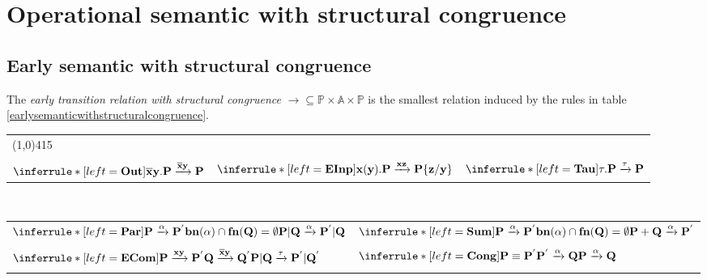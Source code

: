 \section{Operational semantic with structural congruence}

\subsection{Early semantic with structural congruence}

\begin{definition}
  The \emph{early transition relation with structural congruence} $\rightarrow\subseteq \mathbb{P}\times \mathbb{A} \times \mathbb{P}$ is the smallest relation induced by the rules in table \ref{earlysemanticwithstructuralcongruence}.

  \begin{table}
    \begin{tabular}{lll}  
      	\multicolumn{3}{l}{\line(1,0){415}}\\\\
	  $\inferrule* [left=\bf{Out}]{
	  }{
	    \overline{x}y.P \xrightarrow{\overline{x}y} P
	  }$
	&
	  $\inferrule* [left=\bf{EInp}]{
	  }{
	    x(y).P \xrightarrow{xz} P\{z/y\}
	  }$
	&
	  $\inferrule* [left=\bf{Tau}]{
	  }{
	    \tau.P \xrightarrow{\tau} P
	  }$
      \\
    \end{tabular}
    \\
    \begin{tabular}{ll}  
      \\
	  $\inferrule* [left=\bf{Par}]{
	      P \xrightarrow{\alpha} P^{'}
	    \\
	      bn(\alpha)\cap fn(Q)=\emptyset
	  }{
	    P|Q \xrightarrow{\alpha} P^{'}|Q
	  }$
	  &
	  $\inferrule* [left=\bf{Sum}]{
	      P \xrightarrow{\alpha} P^{'}
	    \\
	      bn(\alpha)\cap fn(Q)=\emptyset
	  }{
	    P+Q \xrightarrow{\alpha} P^{'}
	  }$
      \\\\
	  $\inferrule* [left=\bf{ECom}]{
	      P \xrightarrow{xy} P^{'}
	    \\
	      Q\xrightarrow{\overline{x}y} Q^{'}
	  }{
	    P|Q \xrightarrow{\tau} P^{'}|Q^{'}
	  }$
	  &
	  $\inferrule* [left=\bf{Cong}]{
	      P\equiv P^{'}
	    \\
	      P^{'}\xrightarrow{\alpha} Q
	  }{
	    P \xrightarrow{\alpha} Q
	  }$
      \\\\

\end{tabular}
\end{table}
\end{definition}
